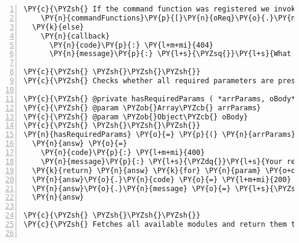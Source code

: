 \begin{Verbatim}[fontsize=\scriptsize,commandchars=\\\{\},numbers=left,firstnumber=1,stepnumber=1]
    \PY{c}{\PYZsh{} If the command function was registered we invoke it}
    \PY{n}{commandFunctions}\PY{p}{[}\PY{n}{oReq}\PY{o}{.}\PY{n}{command}\PY{p}{]} \PY{n}{user}\PY{p}{,} \PY{n}{dat}\PY{p}{,} \PY{n}{callback}
  \PY{k}{else}
    \PY{n}{callback}
      \PY{n}{code}\PY{p}{:} \PY{l+m+mi}{404}
      \PY{n}{message}\PY{p}{:} \PY{l+s}{\PYZsq{}}\PY{l+s}{What do you want from me?}\PY{l+s}{\PYZsq{}}

\PY{c}{\PYZsh{} \PYZsh{}\PYZsh{}\PYZsh{}}
\PY{c}{\PYZsh{} Checks whether all required parameters are present in the body.}

\PY{c}{\PYZsh{} @private hasRequiredParams ( *arrParams, oBody* )}
\PY{c}{\PYZsh{} @param \PYZob{}Array\PYZcb{} arrParams}
\PY{c}{\PYZsh{} @param \PYZob{}Object\PYZcb{} oBody}
\PY{c}{\PYZsh{} \PYZsh{}\PYZsh{}\PYZsh{}}
\PY{n}{hasRequiredParams} \PY{o}{=} \PY{p}{(} \PY{n}{arrParams}\PY{p}{,} \PY{n}{oBody} \PY{p}{)} \PY{o}{\PYZhy{}}\PY{o}{\PYZgt{}}
  \PY{n}{answ} \PY{o}{=}
    \PY{n}{code}\PY{p}{:} \PY{l+m+mi}{400}
    \PY{n}{message}\PY{p}{:} \PY{l+s}{\PYZdq{}}\PY{l+s}{Your request didn}\PY{l+s}{\PYZsq{}}\PY{l+s}{t contain all necessary fields! Requires: \PYZsh{}\PYZob{} arrParams.join() \PYZcb{}}\PY{l+s}{\PYZdq{}}
  \PY{k}{return} \PY{n}{answ} \PY{k}{for} \PY{n}{param} \PY{o+ow}{in} \PY{n}{arrParams} \PY{n}{when} \PY{o+ow}{not} \PY{n}{oBody}\PY{p}{[}\PY{n}{param}\PY{p}{]}
  \PY{n}{answ}\PY{o}{.}\PY{n}{code} \PY{o}{=} \PY{l+m+mi}{200}
  \PY{n}{answ}\PY{o}{.}\PY{n}{message} \PY{o}{=} \PY{l+s}{\PYZsq{}}\PY{l+s}{All required properties found}\PY{l+s}{\PYZsq{}}
  \PY{n}{answ}

\PY{c}{\PYZsh{} \PYZsh{}\PYZsh{}\PYZsh{}}
\PY{c}{\PYZsh{} Fetches all available modules and return them together with the available functions.}


\end{Verbatim}
